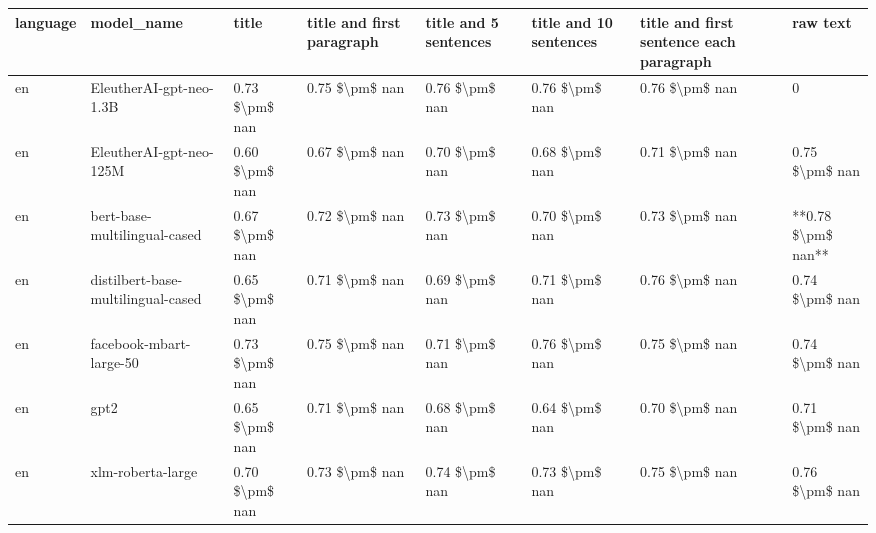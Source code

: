 \begin{tabular}{llllllll}
\toprule
language &                         model\_name &          title & title and first paragraph & title and 5 sentences & title and 10 sentences & title and first sentence each paragraph &           raw text \\
\midrule
      en &            EleutherAI-gpt-neo-1.3B & 0.73 \$\textbackslash pm\$ nan &            0.75 \$\textbackslash pm\$ nan &        0.76 \$\textbackslash pm\$ nan &         0.76 \$\textbackslash pm\$ nan &                          0.76 \$\textbackslash pm\$ nan &                  0 \\
      en &            EleutherAI-gpt-neo-125M & 0.60 \$\textbackslash pm\$ nan &            0.67 \$\textbackslash pm\$ nan &        0.70 \$\textbackslash pm\$ nan &         0.68 \$\textbackslash pm\$ nan &                          0.71 \$\textbackslash pm\$ nan &     0.75 \$\textbackslash pm\$ nan \\
      en &       bert-base-multilingual-cased & 0.67 \$\textbackslash pm\$ nan &            0.72 \$\textbackslash pm\$ nan &        0.73 \$\textbackslash pm\$ nan &         0.70 \$\textbackslash pm\$ nan &                          0.73 \$\textbackslash pm\$ nan & **0.78 \$\textbackslash pm\$ nan** \\
      en & distilbert-base-multilingual-cased & 0.65 \$\textbackslash pm\$ nan &            0.71 \$\textbackslash pm\$ nan &        0.69 \$\textbackslash pm\$ nan &         0.71 \$\textbackslash pm\$ nan &                          0.76 \$\textbackslash pm\$ nan &     0.74 \$\textbackslash pm\$ nan \\
      en &            facebook-mbart-large-50 & 0.73 \$\textbackslash pm\$ nan &            0.75 \$\textbackslash pm\$ nan &        0.71 \$\textbackslash pm\$ nan &         0.76 \$\textbackslash pm\$ nan &                          0.75 \$\textbackslash pm\$ nan &     0.74 \$\textbackslash pm\$ nan \\
      en &                               gpt2 & 0.65 \$\textbackslash pm\$ nan &            0.71 \$\textbackslash pm\$ nan &        0.68 \$\textbackslash pm\$ nan &         0.64 \$\textbackslash pm\$ nan &                          0.70 \$\textbackslash pm\$ nan &     0.71 \$\textbackslash pm\$ nan \\
      en &                  xlm-roberta-large & 0.70 \$\textbackslash pm\$ nan &            0.73 \$\textbackslash pm\$ nan &        0.74 \$\textbackslash pm\$ nan &         0.73 \$\textbackslash pm\$ nan &                          0.75 \$\textbackslash pm\$ nan &     0.76 \$\textbackslash pm\$ nan \\

\end{tabular}
